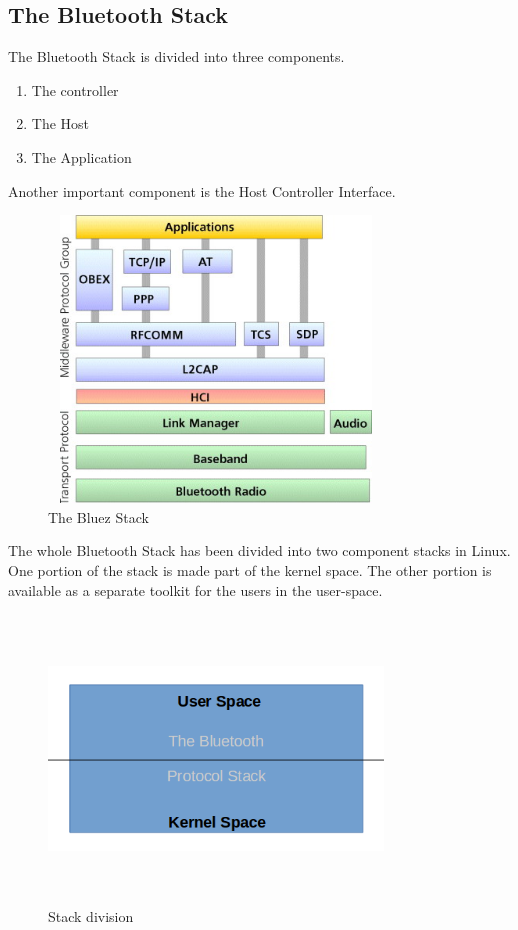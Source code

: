 \subsection{The Bluetooth Stack}
The Bluetooth Stack is divided into three components.
\begin{enumerate}
	\item The controller
	\item The Host
	\item The Application
\end{enumerate}
Another important component is the Host Controller Interface.
\begin{figure}[ht]
	\centering
	\includegraphics[width=3.5in, height=3in]{images/bluetooth_stack.png}
	\caption{The Bluez Stack}
\end{figure}
The whole Bluetooth Stack has been divided into two component stacks in Linux. One portion of the stack is made part of the kernel space. The other portion is available as a separate toolkit for the users in the user-space.
\begin{figure}[ht]
	\centering
	\includegraphics[width=3.5in, height=3in]{images/kernel_userspace.png}
	\caption{Stack division}
\end{figure}
